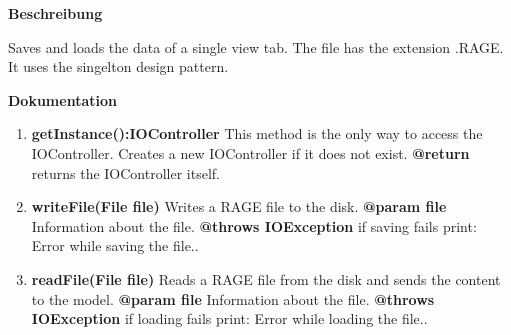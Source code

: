 
\textbf{Beschreibung}

Saves and loads the data of a single view tab. The file has the extension \glqq.RAGE\grqq. It uses the singelton design pattern.

\textbf{Dokumentation}
\begin{enumerate}[+]
	\item{
		\textbf{getInstance():IOController} \newline
		This method is the only way to access the IOController. Creates a new IOController if it does not exist. \newline
		\textbf{@return} returns the IOController itself. \newline
	}
	\item{
		\textbf{writeFile(File file)} \newline
		Writes a RAGE file to the disk. \newline
		\textbf{@param file} Information about the file. \newline
		\textbf{@throws IOException} if saving fails print: \glqq Error while saving the file.\grqq.
	}
	\item{
		\textbf{readFile(File file)} \newline
		Reads a RAGE file from the disk and sends the content to the model. \newline
		\textbf{@param file} Information about the file. \newline
		\textbf{@throws IOException} if loading fails print: \glqq Error while loading the file.\grqq.
	}
\end{enumerate}